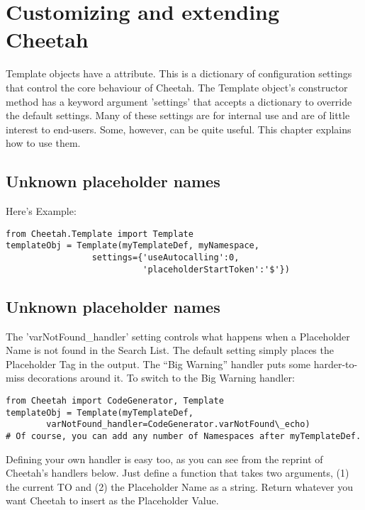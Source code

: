 \section{Customizing and extending Cheetah}
\label{customizing}

Template objects have a  attribute. This is a dictionary of
configuration settings that control the core behaviour of Cheetah.  The Template
object's constructor method has a keyword argument 'settings' that accepts a
dictionary to override the default settings.  Many of these settings are for
internal use and are of little interest to end-users.  Some, however, can be
quite useful. This chapter explains how to use them.

\subsection{Unknown placeholder names}

Here's 
Example:

\begin{verbatim}
from Cheetah.Template import Template
templateObj = Template(myTemplateDef, myNamespace, 
                 settings={'useAutocalling':0,
                           'placeholderStartToken':'$'})
\end{verbatim}


\subsection{Unknown placeholder names}

The 'varNotFound\_handler' setting controls what happens when a Placeholder
Name is not found in the Search List.  The default setting simply places the
Placeholder Tag in the output.  The ``Big Warning'' handler puts some
harder-to-miss decorations around it.  To switch to the Big Warning handler:

\begin{verbatim}
from Cheetah import CodeGenerator, Template
templateObj = Template(myTemplateDef, 
        varNotFound_handler=CodeGenerator.varNotFound\_echo)
# Of course, you can add any number of Namespaces after myTemplateDef.
\end{verbatim}

Defining your own handler is easy too, as you can see from the reprint of
Cheetah's handlers below.  Just define a function that takes two arguments, 
(1) the current TO and (2) the Placeholder Name as a string.  Return whatever
you want Cheetah to insert as the Placeholder Value.

